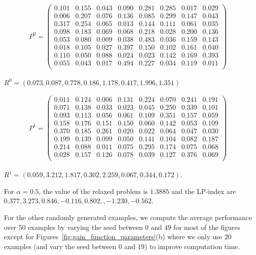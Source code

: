 \begin{align*}
    P^{ 0 }=\left(
    \begin{array}{cccccccc}
       0.101 &0.155 &0.043 &0.090 &0.281 &0.285 &0.017 &0.029 \\
       0.006 &0.207 &0.076 &0.136 &0.085 &0.299 &0.147 &0.043 \\
       0.317 &0.254 &0.065 &0.013 &0.144 &0.111 &0.061 &0.035 \\
       0.098 &0.183 &0.069 &0.068 &0.218 &0.028 &0.200 &0.136 \\
       0.053 &0.080 &0.009 &0.038 &0.483 &0.036 &0.159 &0.143 \\
       0.018 &0.105 &0.027 &0.397 &0.150 &0.102 &0.161 &0.040 \\
       0.110 &0.050 &0.088 &0.024 &0.023 &0.142 &0.169 &0.393 \\
       0.055 &0.043 &0.017 &0.494 &0.227 &0.034 &0.119 &0.011 \\
    \end{array}\right)
\end{align*}

$R^{ 0 } = (0.073, 0.087, 0.778, 0.186, 1.178, 0.417, 1.996, 1.351)$

\begin{align*}
    P^{ 1 }=\left(
    \begin{array}{cccccccc}
       0.011 &0.124 &0.006 &0.131 &0.224 &0.070 &0.241 &0.191 \\
       0.071 &0.138 &0.033 &0.023 &0.045 &0.250 &0.339 &0.101 \\
       0.093 &0.113 &0.056 &0.061 &0.109 &0.351 &0.157 &0.059 \\
       0.158 &0.176 &0.151 &0.150 &0.060 &0.142 &0.053 &0.109 \\
       0.370 &0.185 &0.261 &0.020 &0.022 &0.064 &0.047 &0.030 \\
       0.199 &0.139 &0.099 &0.050 &0.141 &0.104 &0.082 &0.187 \\
       0.214 &0.088 &0.011 &0.075 &0.295 &0.174 &0.075 &0.068 \\
       0.028 &0.157 &0.126 &0.078 &0.039 &0.127 &0.376 &0.069 \\
    \end{array}\right)
\end{align*}

$R^{ 1 } = (0.059, 3.212, 1.817, 0.302, 2.259, 0.067, 0.344, 0.172)$.

For $\alpha=0.5$, the value of the relaxed problem is $1.3885$ and the LP-index are $0.377 , 3.273 , 0.846 , -0.116 , 0.802 ,  , -1.230 , -0.562$.

For the other randomly generated examples, we compute the average performance over 50 examples by varying the seed between $0$ and $49$ for most of the figures except for Figures~\ref{fig:gain_function_parameters}(b) where we only use $20$ examples (and vary the seed between $0$ and $19$) to improve computation time.




